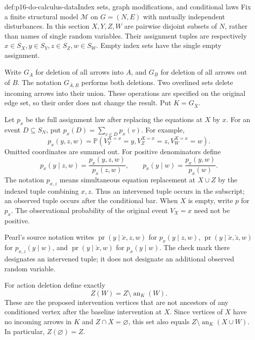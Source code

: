\begin{hbdefinition}{def:p16-do-calculus-data}{Index sets, graph modifications, and conditional laws}
Fix a finite structural model \(\mathcal M\) on \(G=(N,E)\)
with mutually independent disturbances. In this section \(X,Y,Z,W\)
are pairwise disjoint subsets of \(N\), rather than names of single
random variables. Their assignment tuples are respectively
\(x\in S_X,y\in S_Y,z\in S_Z,w\in S_W\).
Empty index sets have the single empty assignment.

Write \(G_{\overline A}\) for deletion of all arrows into \(A\),
and \(G_{\underline B}\) for deletion of all arrows out of \(B\).
The notation \(G_{\overline A,\underline B}\) performs both deletions.
Two overlined sets delete incoming arrows into their union. These
operations are specified on the original edge set, so their order
does not change the result. Put \(K=G_{\overline X}\).

Let \(p_x\) be the full assignment law after replacing the equations
at \(X\) by \(x\). For an event \(D\subseteq S_N\), put
\(p_x(D)=\sum_{v\in D}p_x(v)\). For example,
\[
 p_x(y,z,w)=\mathbb P(V_Y^{X=x}=y,V_Z^{X=x}=z,V_W^{X=x}=w).
\]
Omitted coordinates are summed out. For positive denominators define
\[
 p_x(y\mid z,w)=\frac{p_x(y,z,w)}{p_x(z,w)},\qquad
 p_x(y\mid w)=\frac{p_x(y,w)}{p_x(w)}.
\]
The notation \(p_{x,z}\) means simultaneous equation replacement
at \(X\cup Z\) by the indexed tuple combining \(x,z\).
Thus an intervened tuple occurs in the subscript; an observed tuple
occurs after the conditional bar. When \(X\) is empty, write
\(p\) for \(p_x\). The observational probability of the original
event \(V_X=x\) need not be positive.

Pearl's source notation writes
\(\operatorname{pr}(y\mid\check x,z,w)\) for \(p_x(y\mid z,w)\),
\(\operatorname{pr}(y\mid\check x,\check z,w)\) for
\(p_{x,z}(y\mid w)\), and
\(\operatorname{pr}(y\mid\check x,w)\) for \(p_x(y\mid w)\).
The check mark there designates an intervened tuple; it does not
designate an additional observed random variable.

For action deletion define exactly
\[
 Z(W)=Z\setminus\operatorname{an}_{K}(W).
\]
These are the proposed intervention vertices that are not ancestors of
any conditioned vertex after the baseline intervention at \(X\).
Since vertices of \(X\) have no incoming arrows in \(K\) and
\(Z\cap X=\varnothing\), this set also equals
\(Z\setminus\operatorname{an}_{K}(X\cup W)\).
In particular, \(Z(\varnothing)=Z\).
\end{hbdefinition}

